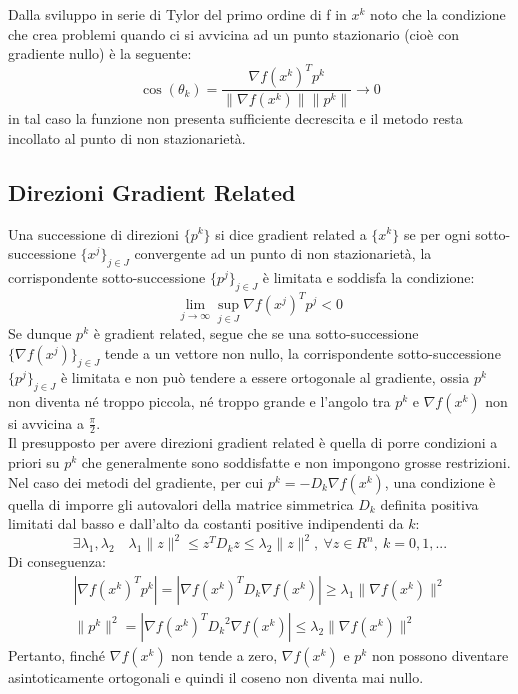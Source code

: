 \documentclass{report}
\begin{document}
Dalla sviluppo in serie di Tylor del primo ordine di f in $x^k$ noto che la condizione che crea problemi quando ci si avvicina ad un punto stazionario (cioè con gradiente nullo) è la seguente:
\begin{equation} 
\label{coseno_nullo}
	\cos (\theta_k) = \frac{\nabla f(x^k)^T p^k}{\| \nabla f(x^k)\| \|p^k\|} \rightarrow 0 
\end{equation}
in tal caso la funzione non presenta sufficiente decrescita e il metodo resta incollato al punto di non stazionarietà.

\subsection{Direzioni Gradient Related}
Una successione di direzioni $\{p^k\}$ si dice gradient related a $\{x^k\}$ se per ogni sotto-successione $\{x^j\}_{j \in J}$ convergente ad un punto di non stazionarietà, la corrispondente sotto-successione $\{p^j\}_{j \in J}$  è limitata e soddisfa la condizione:
\begin{equation} 
\label{grad_rel}
	\lim_{j \rightarrow \infty} \sup_{j \in J} {\nabla f(x^j)^T p^j} < 0
\end{equation}
Se dunque $p^k$ è gradient related, segue che se una sotto-successione $\{\nabla f(x^j)\}_{j \in J}$ tende a un vettore non nullo, la corrispondente sotto-successione$\{p^j\}_{j \in J}$ è limitata e non può tendere a essere ortogonale al gradiente, ossia  $p^k$ non diventa né troppo piccola, né troppo grande e l'angolo tra $p^k$ e $\nabla f(x^k)$ non si avvicina a $\frac{\pi}{2}$.\\

Il presupposto per avere direzioni gradient related è quella di porre condizioni a priori su $p^k$ che generalmente sono soddisfatte e non impongono grosse restrizioni. Nel caso dei metodi del gradiente, per cui $p^k = -D_k \nabla f(x^k)$, una condizione è quella di imporre gli autovalori della matrice simmetrica $D_k$ definita positiva limitati dal basso e dall'alto da costanti positive indipendenti da $k$:
\begin{equation} 
\label{condiz_autoval1}
	\exists \lambda_1,\lambda_2\quad  \lambda_1 \| z \|^2 \leqslant z^T D_k z \leqslant  \lambda_2 \| z \|^2 ,\ \forall z \in R^n,\ k=0,1,...
\end{equation}
Di conseguenza:
\begin{multline}
	| \nabla f(x^k)^T p^k|= | \nabla f(x^k)^T D_k \nabla f(x^k)| \geqslant  \lambda_1 \| \nabla f(x^k) \|^2 \\
	\| p^k \|^2 = | \nabla f(x^k)^T {D_k}^2 \nabla f(x^k)| \leqslant \lambda_2 \| \nabla f(x^k) \|^2
\end{multline}
Pertanto, finché $\nabla f(x^k)$ non tende a zero, $\nabla f(x^k)$ e $p^k$ non possono diventare asintoticamente ortogonali e quindi il coseno non diventa mai nullo.\\
\end{document}
